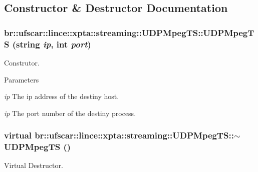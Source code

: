 \subsection{Constructor \& Destructor Documentation}
\hypertarget{classbr_1_1ufscar_1_1lince_1_1xpta_1_1streaming_1_1UDPMpegTS_a8310650ac588f6a5a279cf326cab106a}{
\subsubsection[{UDPMpegTS}]{\setlength{\rightskip}{0pt plus 5cm}br::ufscar::lince::xpta::streaming::UDPMpegTS::UDPMpegTS (string {\em ip}, \/  int {\em port})}}
\label{classbr_1_1ufscar_1_1lince_1_1xpta_1_1streaming_1_1UDPMpegTS_a8310650ac588f6a5a279cf326cab106a}


Construtor. 


\begin{DoxyParams}{Parameters}
\item[{\em ip}]The ip address of the destiny host. \item[{\em ip}]The port number of the destiny process. \end{DoxyParams}
\hypertarget{classbr_1_1ufscar_1_1lince_1_1xpta_1_1streaming_1_1UDPMpegTS_a1fc39a40dcc5bf34200c44c0b271925a}{
\subsubsection[{$\sim$UDPMpegTS}]{\setlength{\rightskip}{0pt plus 5cm}virtual br::ufscar::lince::xpta::streaming::UDPMpegTS::$\sim$UDPMpegTS ()}}
\label{classbr_1_1ufscar_1_1lince_1_1xpta_1_1streaming_1_1UDPMpegTS_a1fc39a40dcc5bf34200c44c0b271925a}


Virtual Destructor. 



